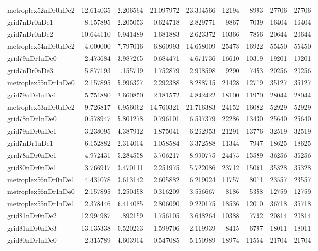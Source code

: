 \begin{longtable}{|l|r|r|r|r|r|r|r|r|}
metroplex52nDr0nDe2 & 12.614035 & 2.206594 & 21.097972 & 23.304566 & 12194 & 8993 & 27706 & 27706 \\
grid7nDr0nDe1 & 8.157895 & 2.205053 & 0.624718 & 2.829771 & 9867 & 7039 & 16404 & 16404 \\
grid7nDr0nDe2 & 10.644110 & 0.941489 & 1.681883 & 2.623372 & 10366 & 7856 & 20644 & 20644 \\
metroplex54nDr0nDe2 & 4.000000 & 7.797016 & 6.860993 & 14.658009 & 25478 & 16922 & 55450 & 55450 \\
grid79nDr1nDe0 & 2.473684 & 3.987265 & 0.684471 & 4.671736 & 16610 & 10319 & 19201 & 19201 \\
grid7nDr0nDe3 & 5.877193 & 1.155719 & 1.752879 & 2.908598 & 9290 & 7453 & 20256 & 20256 \\
metroplex55nDr1nDe0 & 2.157895 & 5.996327 & 2.292388 & 8.288715 & 21428 & 12779 & 35127 & 35127 \\
grid79nDr1nDe1 & 5.751880 & 2.660850 & 2.181572 & 4.842422 & 18100 & 11970 & 28044 & 28044 \\
metroplex53nDr0nDe2 & 9.726817 & 6.956062 & 14.760321 & 21.716383 & 24152 & 16082 & 52929 & 52929 \\
grid78nDr1nDe0 & 0.578947 & 5.801278 & 0.796101 & 6.597379 & 22286 & 13430 & 25640 & 25640 \\
grid79nDr0nDe1 & 3.238095 & 4.387912 & 1.875041 & 6.262953 & 21291 & 13776 & 32519 & 32519 \\
grid7nDr1nDe1 & 6.152882 & 2.314004 & 1.058584 & 3.372588 & 11344 & 7947 & 18625 & 18625 \\
grid78nDr0nDe1 & 4.972431 & 5.284558 & 3.706217 & 8.990775 & 24473 & 15589 & 36256 & 36256 \\
grid80nDr0nDe1 & 3.766917 & 3.470111 & 2.251975 & 5.722086 & 23712 & 15061 & 35328 & 35328 \\
metroplex56nDr0nDe1 & 4.431078 & 3.613142 & 2.605882 & 6.219024 & 11757 & 8071 & 23557 & 23557 \\
metroplex56nDr1nDe0 & 2.157895 & 3.250458 & 0.316209 & 3.566667 & 8186 & 5358 & 12759 & 12759 \\
metroplex55nDr1nDe1 & 2.378446 & 6.414085 & 2.806090 & 9.220175 & 18536 & 12010 & 36718 & 36718 \\
grid81nDr0nDe2 & 12.994987 & 1.892159 & 1.756105 & 3.648264 & 10388 & 7792 & 20814 & 20814 \\
grid81nDr0nDe3 & 13.135338 & 0.520233 & 1.599706 & 2.119939 & 8415 & 6797 & 18011 & 18011 \\
grid80nDr1nDe0 & 2.315789 & 4.603904 & 0.547085 & 5.150989 & 18974 & 11554 & 21704 & 21704 \\

\end{longtable}

